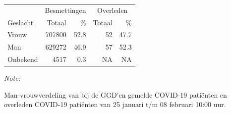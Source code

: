 \documentclass[
  english,
  man,floatsintext]{apa6}
\begin{document}
\begin{table}
\centering\begingroup\fontsize{11}{13}\selectfont

\begin{threeparttable}
\begin{tabular}{lrrrr}
\toprule
\multicolumn{1}{c}{ } & \multicolumn{2}{c}{Besmettingen} & \multicolumn{2}{c}{Overleden} \\
\cmidrule(l{3pt}r{3pt}){2-3} \cmidrule(l{3pt}r{3pt}){4-5}
Geslacht & Totaal & \% & Totaal & \%\\
\midrule
Vrouw & 707800 & 52.8 & 52 & 47.7\\
Man & 629272 & 46.9 & 57 & 52.3\\
Onbekend & 4517 & 0.3 & NA & NA\\
\bottomrule
\end{tabular}
\begin{tablenotes}
\item \textit{Note: } 
\item Man-vrouwverdeling van bij de GGD’en gemelde COVID-19 patiënten en overleden COVID-19 patiënten van 25 januari t/m 08 februari 10:00 uur.
\end{tablenotes}
\end{threeparttable}
\endgroup{}
\end{table}
\newpage
\end{document}

